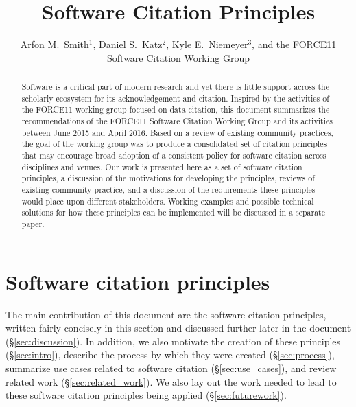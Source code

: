 \documentclass[12pt, oneside]{amsart}
\title{Software Citation Principles}
\author{Arfon M.~Smith$^1$, Daniel S.~Katz$^2$, Kyle E.~Niemeyer$^3$, and the FORCE11 Software Citation Working Group}
\date{}
\newcommand{\katznote}[1]{ {\textcolor{blue} { ***DSK: #1 }}} %
\newcommand{\niemnote}[1]{ {\textcolor{orange} { ***KEN: #1 }}} %
\begin{document}
\begin{abstract}

\vspace{-0.2cm}
Software is a critical part of modern research and yet there is little support across the scholarly ecosystem for its acknowledgement and citation.
Inspired by the activities of the FORCE11 working group focused on data citation, this document summarizes the recommendations of the FORCE11 Software Citation Working Group and its activities between June 2015 and April 2016.
Based on a review of existing community practices, the goal of the working group was to produce a consolidated set of citation principles that may encourage broad adoption of a consistent policy for software citation across disciplines and venues.
Our work is presented here as a set of software citation principles, a discussion of the motivations for developing the principles, reviews of existing community practice, and a discussion of the requirements these principles would place upon different stakeholders.
Working examples and possible technical solutions for how these principles can be implemented will be discussed in a separate paper.
\vspace{-1.0cm}

\end{abstract}

\maketitle

\section{Software citation principles}
\label{sec:principles}


The main contribution of this document are the software citation principles,
written fairly concisely in this section and discussed further later in the
document (\S\ref{sec:discussion}). In addition, we also motivate the creation
of these principles (\S\ref{sec:intro}), describe the process by which they
were created (\S\ref{sec:process}), summarize use cases related to software
citation (\S\ref{sec:use_cases}), and review related work
(\S\ref{sec:related_work}). We also lay out  
the work needed to lead to these
software citation principles being applied (\S\ref{sec:futurework}).
\end{document}
